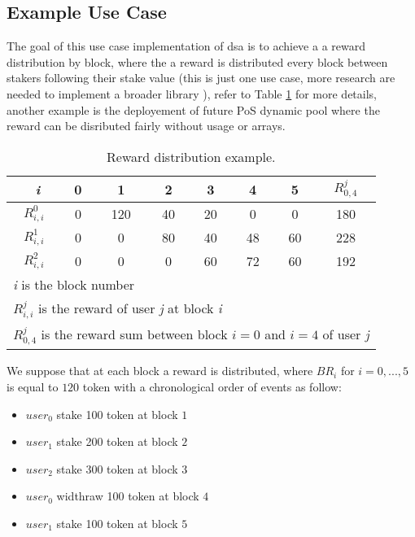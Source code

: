 \documentclass[a4paper]{article}
\begin{document}
\subsection{Example Use Case}
\noindent
The goal of this use case implementation of \acrshort{dsa} is to achieve a a reward distribution by block, where the a reward is distributed every block between stakers following their stake value (this is just one use case, more research are needed to implement a broader library ), refer to Table \ref{tab:table_reward_example} for more details, another example is the deployement of future PoS dynamic pool where the reward can be disributed fairly without usage or arrays.\par
\begin{table}[h!]
  \begin{center}
    \caption{Reward distribution example.}
    \label{tab:table_reward_example}
    \begin{tabular}{ c | c c c c c c || c }
      \hline \
  	  \textit{i} & 0 & 1 &  2 & 3 & 4 & 5 & $\mathit{R_{0,4}^j}$ \\
  	  \hline
      $R_{i,i}^0$ & 0 & 120 & 40 & 20 & 0 & 0 & 180 \\ 
      $R_{i,i}^1$ & 0 & 0 & 80 & 40 & 48 & 60 & 228 \\ 
      $R_{i,i}^2$ & 0 & 0 & 0 & 60 & 72 & 60 & 192 \\
      \hline
      \multicolumn{8}{l}{\footnotesize \textit{i} is the block number}\\
      \multicolumn{8}{l}{\footnotesize $R_{i,i}^j$ is the reward of user \textit{j} at block \textit{i}}\\
      \multicolumn{8}{l}{\footnotesize $R_{0,4}^j$ is the reward sum between block $i=0$ and $i=4$ of user \textit{j} }\\
    \end{tabular}
  \end{center}
\end{table}
\noindent
We suppose that at each block a reward is distributed, where $\mathit{BR}_i$ for $i=0,...,5$ is equal to $120$ \acrshort{token} with a chronological order of events as follow:
\begin{itemize}
  \setlength\itemsep{0.1em}
  \item $user_0$ stake 100 \acrshort{token} at block $1$
  \item $user_1$ stake 200 \acrshort{token} at block $2$
  \item $user_2$ stake 300 \acrshort{token} at block $3$
  \item $user_0$ widthraw 100 \acrshort{token} at block $4$
  \item $user_1$ stake 100 \acrshort{token} at block $5$
\end{itemize}
\end{document}
